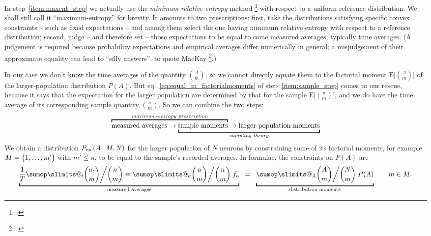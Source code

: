 \documentclass[\ifafour a4paper,12pt,\else a5paper,10pt,\fi%
onecolumn,oneside,article,%
british%
]{memoir}
\makeatletter
\theoremstyle{remark}
\theoremstyle{innote}
\def\sum{\DOTSI\sumop\slimits@}
\newcommand*{\citep}{\footcites}
\renewcommand*{\le}{\leqslant}%
\DeclarePairedDelimiter\set{\{}{\}}
\newcommand*{\E}{\mathrm{E}}
\renewcommand*{\|}{\nonscript\,\vert\nonscript\;\mathopen{}}
\newcommand*{\sect}{\S}%
\newcommand*{\eqn}{eq.}%
\newcommand*{\yAv}{A}
\newcommand*{\yav}{a}
\newcommand*{\yff}{f}
\newcommand*{\ya}{\yav}%
\newcommand*{\yA}{\yAv}%
\newcommand*{\px}{P_{\text{me}}}
\newcommand*{\pxxx}{P}
\makeatother
\begin{document}
\medskip


In step~\ref{item:maxent_step} we actually use the
\emph{minimum-relative-entropy} method
\citep{hobsonetal1973,csiszar1985}[\sect~5.2.2]{sivia1996_r2006} with
respect to a uniform reference distribution. We shall still call it
\enquote{maximum-entropy} for brevity. It amounts to two prescriptions:
first, take the distributions satisfying specific convex constraints --
such as fixed expectations -- and among them select the one having minimum
relative entropy with respect to a reference distribution; second, judge --
and therefore set -- those expectations to be equal to some measured
averages, typically time averages. (A judgement is required because
probability expectations and empirical averages differ numerically in
general; a misjudgement of their approximate equality can lead to
\enquote{silly answers}, to quote MacKay \citep[p.~308]{mackay1995_r2003}.)

In our case we don't know the time averages of the quantity
$\binom{\yA}{m}$, so we cannot directly equate them to the factorial moment
$\E\bigl[\binom{\yA}{m}\bigr]$ of the larger-population distribution
$\pxxx(\yA)$. But \eqn~\eqref{eq:equal_m_factorialmoments} of
step~\ref{item:sample_step} comes to our rescue, because it says that the
expectation for the larger population are determined by that for the sample
$\E\bigl[\binom{\ya}{m}\bigr]$, and we do have the time average of its
corresponding sample quantity $\binom{\ya}{m}$. So we can combine the two
steps:
\begin{equation*}
  \label{eq:chain_prescription_moments}
  \mathrlap{\overbracket{\phantom{\text{measured averages} \rightarrow
        \text{sample moments}}}^{\textit{maximum-entropy prescription}}}
  \text{measured averages} \rightarrow
        \underbracket{\text{sample moments}
  \rightarrow
    \text{larger-population moments}}_{\textit{sampling theory}}
\end{equation*}
We obtain a distribution $\px(\yA \| M, N)$ for the larger population of
$N$ neurons by constraining some of its factorial moments, for example
$M=\set{1,\dotsc,m'}$ with $m'\le n$, to be equal to the sample's recorded
averages. In formulae, the constraints on $\pxxx(\yA)$ are
\begin{equation}
  \label{eq:final_constraint}
  \underbracket{\frac{1}{T}\sum_{t}\binom{\ya_{t}}{m}\bigg/\binom{n}{m}
  \equiv
   \sum_{\ya}
  \binom{\ya}{m}\bigg/  \binom{n}{m} \; \yff_{\ya}}_{\text{measured averages}}
  \mathrel{\;\;=\;\;}
   \underbracket{\sum_{\yA}
     \binom{\yA}{m}\bigg/  \binom{N}{m} \; \pxxx(\yA)}_{\text{distribution moments}}
   \qquad m\in M.
\end{equation}
\smallskip
\end{document}
